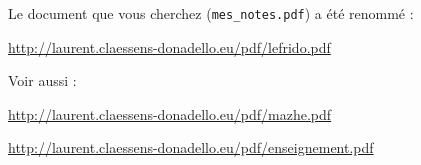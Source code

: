 \documentclass[a4paper,12pt]{article}
\newcommand{\info}[1]{\texttt{#1}}
\begin{document}
Le document que vous cherchez (\info{mes\_notes.pdf}) a été renommé :
\begin{center}
        \url{http://laurent.claessens-donadello.eu/pdf/lefrido.pdf}
\end{center}


\vfill

Voir aussi :


        \begin{center}
        \url{http://laurent.claessens-donadello.eu/pdf/mazhe.pdf}
        \end{center}



        \begin{center}
            \url{http://laurent.claessens-donadello.eu/pdf/enseignement.pdf}
        \end{center}
\end{document}
